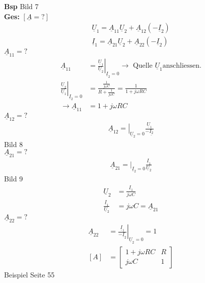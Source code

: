 \textbf{Bsp}
Bild 7\\
\textbf{Ges:} $[\underline{A}=?]$\\
\begin{align}
	\underline{U}_1=\underline{A}_{11}\underline{U}_2+\underline{A}_{12}\left(-\underline{I}_2\right)\nonumber\\
	\underline{I}_1=\underline{A}_{21}\underline{U}_2+\underline{A}_{22}\left(-\underline{I}_2\right)\nonumber
\end{align}
$\underline{A}_{11}=?$\\
\begin{align}
	\underline{A}_{11}&=\left.\frac{\underline{U}_1}{\underline{U}_2}\right|_{\underline{I}_2=0}
	\rightarrow\text{ Quelle } \underline{U}_1 \text{anschliessen.}\nonumber\\
	\left.\frac{\underline{U}_2}{\underline{U}_1}\right|_{\underline{I}_2=0}&=\frac{\frac{1}{j\omega
	C}}{R+\frac{1}{j\omega C}}=\frac{1}{1+j\omega RC}\nonumber\\
	\rightarrow \underline{A}_{11}&=1+j\omega RC\nonumber
\end{align}
$\underline{A}_{12}=?$\\
\begin{align}
	\left.\underline{A}_{12}=\right|_{\underline{U}_2=0}\frac{\underline{U}_1}{-\underline{{I}_2}}\nonumber
\end{align}
Bild 8\\
$\underline{A}_{21}=?$\\
\begin{align}
	\underline{A}_{21}\left.=\right|_{\underline{I}_2=0}\frac{\underline{I}_1}{\underline{U}_2}\nonumber
\end{align}
Bild 9
\begin{align}
	\underline{U}_2&=\frac{\underline{I}_1}{j\omega C}\nonumber\\
	\frac{\underline{I}_1}{\underline{U}_2}&=j\omega C =
	\underline{A}_{21}\nonumber
\end{align}
$\underline{A}_{22}=?$\\
\begin{align}
	\underline{A}_{22}&=\left.\frac{\underline{I}_1}{-\underline{I}_2}\right|_{\underline{U}_2=0}=1\nonumber\\
	[A]&=
	\begin{bmatrix}
		1+j\omega RC & R\\
		j\omega C & 1
	\end{bmatrix}\nonumber
\end{align}
Beispiel Seite 55\\
